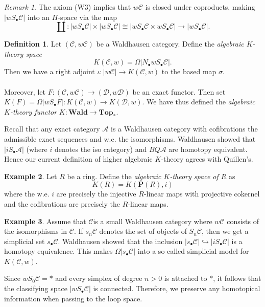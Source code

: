 \documentclass[10pt,letterpaper,cm]{nupset}
\theoremstyle{definition}
\newtheorem{definition}{Definition}
\newtheorem{exmp}[definition]{Example}
\theoremstyle{theorem}
\theoremstyle{remark}
\newtheorem{remark}{Remark}
\renewcommand{\P}{\mathbf P}
\newcommand{\1}{\mathbf{1}}
\renewcommand{\a}{\mathscr{A}}
\renewcommand{\c}{\mathscr{C}}
\renewcommand{\d}{\mathscr{D}}
\newcommand{\0}{\vec 0}
\begin{document}
\begin{remark}
The axiom (W3) implies that $w\c$ is closed under coproducts, making $|wS_{\bullet} \c|$ into an $H$-space via the map $$\coprod: |wS_{\bullet} \c| \times |wS_{\bullet} \c| \cong |wS_{\bullet} \c \times  wS_{\bullet} \c|\to |wS_{\bullet} \c|.$$
\end{remark}

\begin{definition}
Let $(\c, w\c)$ be a Waldhausen category. Define the \textit{algebraic $K$-theory space} $$K(\c, w) = \Omega | N_{\bullet} wS_{\bullet} \c|.$$ Then we have a right adjoint $\iota: |w \c | \to K(\c, w)$ to the based map $\sigma$.
\\ \\ Moreover,
let $F : (\c, w \c) \to (\d, w\d)$ be an exact functor. Then set $K(F) = \Omega | wS_{\bullet}F| : K(\c, w) \to K(\d, w)$. We have thus defined the \textit{algebraic $K$-theory functor} $K : \mathbf{Wald} \to \mathbf{Top_{\ast}}.$
\end{definition}


Recall that any exact category $\a$ is a Waldhausen category with cofibrations the admissible exact sequences and w.e. the isomorphisms. Waldhausen showed that $|iS_{\bullet}\a|$ (where $i$ denotes the iso category) and $BQ\a$ are homotopy equivalent. Hence our current definition of higher algebraic $K$-theory agrees with Quillen's.


\begin{exmp}
Let $R$ be a ring. Define the \textit{algebraic $K$-theory space of $R$} as $$K(R) = K(\P(R), i)$$ where the w.e. $i$ are precisely the injective $R$-linear maps with projective cokernel and the cofibrations are precisely the $R$-linear maps.
\end{exmp}

\begin{exmp}
Assume that $\c$is a small Waldhausen category where $w\c$ consists of the isomorphisms in $\c$. If $s_n\c$ denotes the set of objects of $S_n \c$, then we get a simplicial set $s_{\bullet} \c$. Waldhausen showed that the inclusion $|s_{\bullet} \c| \hookrightarrow |iS_{\bullet} \c|$ is a homotopy equivalence. This makes $\Omega |s_{\bullet} \c|$ into a so-called simplicial model for $K(\c, w)$.
\end{exmp}

Since $wS_0 \c = \ast$ and every simplex of degree $n >0$ is attached to $\ast$, it follows that the classifying space $|w S_{\bullet} \c|$ is connected. Therefore, we preserve any homotopical information when passing to the loop space.
\end{document}
